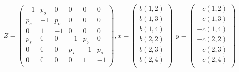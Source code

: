 \begin{equation}\label{eq:example_algebaric_approach_blocking_time}
    Z=
    \begin{pmatrix}
        -1 & p_o & 0 & 0 & 0 & 0 \\ %
        p_s & -1 & p_o & 0 & 0 & 0 \\ %
        0 & 1 & -1 & 0 & 0 & 0 \\ %
        p_s & 0 & 0 & -1 & p_o & 0\\ %
        0 & 0 & 0 & p_s & -1 & p_o \\ %
        0 & 0 & 0 & 0 & 1 & -1 \\ %
    \end{pmatrix},
    x=
    \begin{pmatrix}
        b(1,2) \\
        b(1,3) \\
        b(1,4) \\
        b(2,2) \\
        b(2,3) \\
        b(2,4) \\
    \end{pmatrix}, 
    y=
    \begin{pmatrix}
        -c(1,2) \\
        -c(1,3) \\
        -c(1,4) \\
        -c(2,2) \\
        -c(2,3) \\
        -c(2,4) \\
    \end{pmatrix}
\end{equation}
